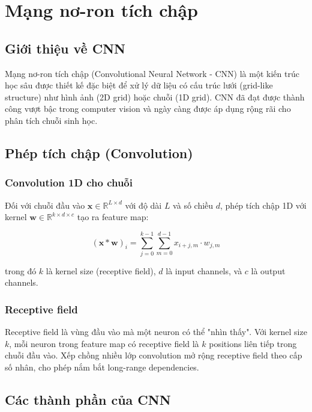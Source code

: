 \section{Mạng nơ-ron tích chập}
\label{sec:cnn}

\subsection{Giới thiệu về CNN}

Mạng nơ-ron tích chập (Convolutional Neural Network - CNN) là một kiến trúc học sâu được thiết kế đặc biệt để xử lý dữ liệu có cấu trúc lưới (grid-like structure) như hình ảnh (2D grid) hoặc chuỗi (1D grid). CNN đã đạt được thành công vượt bậc trong computer vision và ngày càng được áp dụng rộng rãi cho phân tích chuỗi sinh học.

\subsection{Phép tích chập (Convolution)}

\subsubsection{Convolution 1D cho chuỗi}

Đối với chuỗi đầu vào $\mathbf{x} \in \mathbb{R}^{L \times d}$ với độ dài $L$ và số chiều $d$, phép tích chập 1D với kernel $\mathbf{w} \in \mathbb{R}^{k \times d \times c}$ tạo ra feature map:

\begin{equation}
(\mathbf{x} * \mathbf{w})_i = \sum_{j=0}^{k-1} \sum_{m=0}^{d-1} x_{i+j,m} \cdot w_{j,m}
\end{equation}

trong đó $k$ là kernel size (receptive field), $d$ là input channels, và $c$ là output channels.

\subsubsection{Receptive field}

Receptive field là vùng đầu vào mà một neuron có thể "nhìn thấy". Với kernel size $k$, mỗi neuron trong feature map có receptive field là $k$ positions liên tiếp trong chuỗi đầu vào. Xếp chồng nhiều lớp convolution mở rộng receptive field theo cấp số nhân, cho phép nắm bắt long-range dependencies.

\subsection{Các thành phần của CNN}

